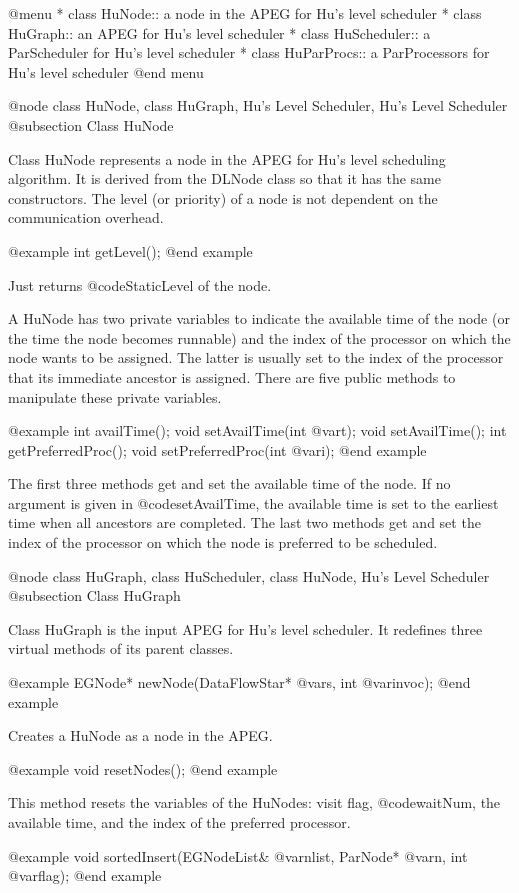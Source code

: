 @menu
* class HuNode::		a node in the APEG for Hu's level scheduler
* class HuGraph::		an APEG for Hu's level scheduler
* class HuScheduler::		a ParScheduler for Hu's level scheduler
* class HuParProcs::		a ParProcessors for Hu's level scheduler
@end menu

@node class HuNode, class HuGraph, Hu's Level Scheduler, Hu's Level Scheduler
@subsection Class HuNode

Class HuNode represents a node in the APEG for Hu's level scheduling algorithm.
It is derived from the DLNode class so that it has the same constructors.
The level (or priority) of a node is not dependent on the communication 
overhead.

@example
int getLevel();
@end example

Just returns @code{StaticLevel} of the node.

A HuNode has two private variables to indicate the available time of the node
(or the time the node becomes runnable)
and the index of the processor on which the node wants to be assigned. 
The latter is usually set to the index of the processor that its immediate
ancestor is assigned. There are five public methods to manipulate these
private variables.

@example
int availTime();
void setAvailTime(int @var{t});
void setAvailTime();
int getPreferredProc();
void setPreferredProc(int @var{i});
@end example

The first three methods get and set the available time of the node. If no
argument is given in @code{setAvailTime}, the available time is set to
the earliest time when all ancestors are completed. The last two methods
get and set the index of the processor on which
the node is preferred to be scheduled.

@node class HuGraph, class HuScheduler, class HuNode, Hu's Level Scheduler
@subsection Class HuGraph

Class HuGraph is the input APEG for Hu's level scheduler. It redefines
three virtual methods of its parent classes.

@example
EGNode* newNode(DataFlowStar* @var{s}, int @var{invoc});
@end example

Creates a HuNode as a node in the APEG.

@example
void resetNodes();
@end example

This method resets the variables of the HuNodes: visit flag, @code{waitNum},
the available time, and the index of the preferred processor.

@example
void sortedInsert(EGNodeList& @var{nlist}, ParNode* @var{n}, int @var{flag});
@end example


